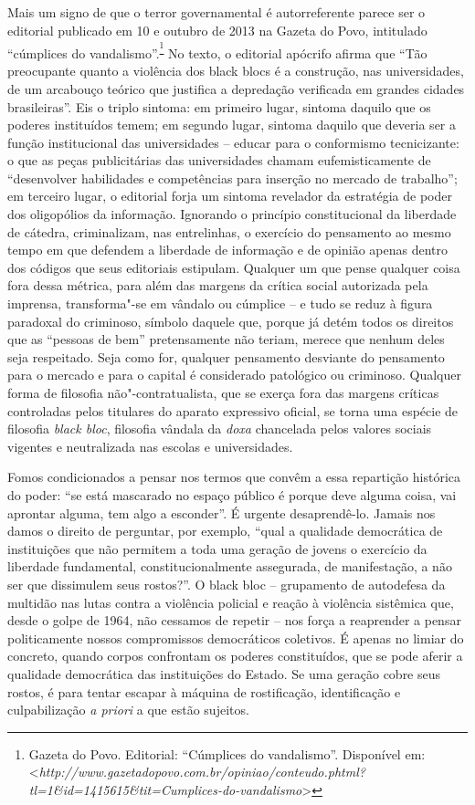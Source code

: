 Mais um signo de que o terror governamental é autorreferente parece ser
o editorial publicado em 10 e outubro de 2013 na Gazeta do Povo,
intitulado ``cúmplices do vandalismo''.\textsuperscript{\footnote{Gazeta
  do Povo. Editorial: ``Cúmplices do vandalismo''. Disponível em:
  \textless{}{\emph{http://www.gazetadopovo.com.br/opiniao/conteudo.phtml?tl=1\&id=1415615\&tit=Cumplices-do-vandalismo}}\textgreater{}}}
No texto, o editorial apócrifo afirma que ``Tão preocupante quanto a
violência dos black blocs é a construção, nas universidades, de um
arcabouço teórico que justifica a depredação verificada em grandes
cidades brasileiras''. Eis o triplo sintoma: em primeiro lugar, sintoma
daquilo que os poderes instituídos temem; em segundo lugar, sintoma
daquilo que deveria ser a função institucional das universidades --
educar para o conformismo tecnicizante: o que as peças publicitárias das
universidades chamam eufemisticamente de ``desenvolver habilidades e
competências para inserção no mercado de trabalho''; em terceiro lugar,
o editorial forja um sintoma revelador da estratégia de poder dos
oligopólios da informação. Ignorando o princípio constitucional da
liberdade de cátedra, criminalizam, nas entrelinhas, o exercício do
pensamento ao mesmo tempo em que defendem a liberdade de informação e de
opinião apenas dentro dos códigos que seus editoriais estipulam.
Qualquer um que pense qualquer coisa fora dessa métrica, para além das
margens da crítica social autorizada pela imprensa, transforma"-se em
vândalo ou cúmplice -- e tudo se reduz à figura paradoxal do criminoso,
símbolo daquele que, porque já detém todos os direitos que as ``pessoas
de bem'' pretensamente não teriam, merece que nenhum deles seja
respeitado. Seja como for, qualquer pensamento desviante do pensamento
para o mercado e para o capital é considerado patológico ou criminoso.
Qualquer forma de filosofia não"-contratualista, que se exerça fora das
margens críticas controladas pelos titulares do aparato expressivo
oficial, se torna uma espécie de filosofia \emph{black bloc}, filosofia
vândala da \emph{doxa }chancelada pelos valores sociais vigentes e
neutralizada nas escolas e universidades.

Fomos condicionados a pensar nos termos que convêm a essa repartição
histórica do poder: ``se está mascarado no espaço público é porque deve
alguma coisa, vai aprontar alguma, tem algo a esconder''. É urgente
desaprendê-lo. Jamais nos damos o direito de perguntar, por exemplo,
``qual a qualidade democrática de instituições que não permitem a toda
uma geração de jovens o exercício da liberdade fundamental,
constitucionalmente assegurada, de manifestação, a não ser que
dissimulem seus rostos?''. O black bloc -- grupamento de autodefesa da
multidão nas lutas contra a violência policial e reação à violência
sistêmica que, desde o golpe de 1964, não cessamos de repetir -- nos
força a reaprender a pensar politicamente nossos compromissos
democráticos coletivos. É apenas no limiar do concreto, quando corpos
confrontam os poderes constituídos, que se pode aferir a qualidade
democrática das instituições do Estado. Se uma geração cobre seus
rostos, é para tentar escapar à máquina de rostificação, identificação e
culpabilização \emph{a priori} a que estão sujeitos.

